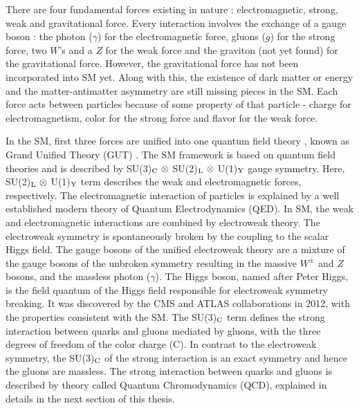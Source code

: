 There are four fundamental forces existing in nature : electromagnetic, strong, weak and gravitational force. Every interaction involves the exchange of a gauge boson : the photon ($\gamma$) for the electromagnetic force, gluons ($g$) for the strong force, two $W$'s and a $Z$ for the weak force and the graviton (not yet found) for the gravitational force. However, the gravitational force has not been incorporated into SM yet. Along with this, the existence of dark matter or energy and the matter-antimatter asymmetry are still missing pieces in the SM. Each force acts between particles because of some property of that particle - charge for electromagnetism, color for the strong force and flavor for the weak force. 

In the SM, first three forces are unified into one quantum field theory \cite{Peskin:1995ev}, known as Grand Unified Theory (GUT) \cite{Glashow:1979pj,Salam:1980jd,Georgi:1974sy}. The SM framework is based on quantum field theories and is described by SU(3)$_{\rm C}~\otimes$ SU(2)$_{\rm L}~\otimes$ U(1)$_{\rm Y}$ gauge symmetry. Here, SU(2)$_{\rm L}~\otimes$ U(1)$_{\rm Y}$ term describes the weak and electromagnetic forces, respectively. The electromagnetic interaction of particles is explained by a well established modern theory of Quantum Electrodynamics (QED). In SM, the weak and electromagnetic interactions are combined by electroweak theory. The electroweak symmetry is spontaneously broken by the coupling to the scalar Higgs field. The gauge bosons of the unified electroweak theory are a mixture of the gauge bosons of the unbroken symmetry resulting in the massive $W^{\pm}$ and $Z$ bosons, and the massless photon ($\gamma$). The Higgs boson, named after Peter Higgs, is the field quantum of the Higgs field responsible for electroweak symmetry breaking. It was discovered by the CMS \cite{Chatrchyan:2012xdj} and ATLAS \cite{Aad:2012tfa} collaborations in 2012, with the properties consistent with the SM. The SU(3)$_{\rm C}$ term defines the strong interaction between quarks and gluons mediated by gluons, with the three degrees of freedom of the color charge (C). In contrast to the electroweak symmetry, the SU(3)$_{\rm C}$ of the strong interaction is an exact symmetry and hence the gluons are massless. The strong interaction between quarks and gluons is described by theory called Quantum Chromodynamics (QCD), explained in details in the next section of this thesis.

